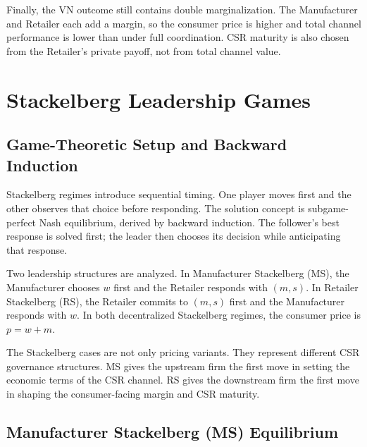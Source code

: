 Finally, the VN outcome still contains double marginalization. The Manufacturer and Retailer each add a margin, so the consumer price is higher and total channel performance is lower than under full coordination. CSR maturity is also chosen from the Retailer's private payoff, not from total channel value.

\section{Stackelberg Leadership Games}
\label{sec:stackelberg}

\subsection{Game-Theoretic Setup and Backward Induction}

Stackelberg regimes introduce sequential timing. One player moves first and the other observes that choice before responding. The solution concept is subgame-perfect Nash equilibrium, derived by backward induction. The follower's best response is solved first; the leader then chooses its decision while anticipating that response.

Two leadership structures are analyzed. In Manufacturer Stackelberg (MS), the Manufacturer chooses $w$ first and the Retailer responds with $(m,s)$. In Retailer Stackelberg (RS), the Retailer commits to $(m,s)$ first and the Manufacturer responds with $w$. In both decentralized Stackelberg regimes, the consumer price is $p=w+m$.

The Stackelberg cases are not only pricing variants. They represent different CSR governance structures. MS gives the upstream firm the first move in setting the economic terms of the CSR channel. RS gives the downstream firm the first move in shaping the consumer-facing margin and CSR maturity.

\subsection{Manufacturer Stackelberg (MS) Equilibrium}

